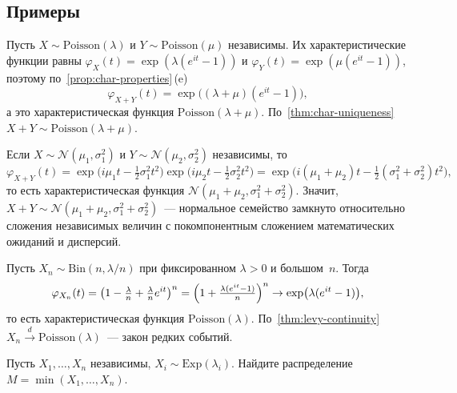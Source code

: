 \subsection*{Примеры}

\begin{example}
\label{ex:poisson-sum}
Пусть $X \sim \mathrm{Poisson}(\lambda)$ и $Y \sim \mathrm{Poisson}(\mu)$ независимы. Их характеристические функции равны $\varphi_X(t) = \exp(\lambda(e^{it} - 1))$ и $\varphi_Y(t) = \exp(\mu(e^{it} - 1))$, поэтому по~\cref{prop:char-properties}\,(e)
\[
  \varphi_{X + Y}(t) = \exp\bigl((\lambda + \mu)(e^{it} - 1)\bigr),
\]
а это характеристическая функция $\mathrm{Poisson}(\lambda + \mu)$. По~\cref{thm:char-uniqueness} $X + Y \sim \mathrm{Poisson}(\lambda + \mu)$.
\end{example}

\begin{example}
\label{ex:normal-sum}
Если $X \sim \mathcal{N}(\mu_1, \sigma_1^2)$ и $Y \sim \mathcal{N}(\mu_2, \sigma_2^2)$ независимы, то
\[
  \varphi_{X + Y}(t) = \exp\bigl(i \mu_1 t - \tfrac{1}{2} \sigma_1^2 t^2\bigr) \exp\bigl(i \mu_2 t - \tfrac{1}{2} \sigma_2^2 t^2\bigr) = \exp\bigl(i(\mu_1 + \mu_2) t - \tfrac{1}{2}(\sigma_1^2 + \sigma_2^2) t^2\bigr),
\]
то есть характеристическая функция $\mathcal{N}(\mu_1 + \mu_2, \sigma_1^2 + \sigma_2^2)$. Значит, $X + Y \sim \mathcal{N}(\mu_1 + \mu_2, \sigma_1^2 + \sigma_2^2)$~--- нормальное семейство замкнуто относительно сложения независимых величин с покомпонентным сложением математических ожиданий и дисперсий.
\end{example}

\begin{example}
\label{ex:poisson-approx-binomial}
Пусть $X_n \sim \mathrm{Bin}(n, \lambda/n)$ при фиксированном $\lambda > 0$ и большом~$n$. Тогда
\[
  \varphi_{X_n}(t) = \bigl(1 - \tfrac{\lambda}{n} + \tfrac{\lambda}{n} e^{it}\bigr)^n = \Bigl(1 + \tfrac{\lambda(e^{it} - 1)}{n}\Bigr)^n \to \exp\bigl(\lambda(e^{it} - 1)\bigr),
\]
то есть характеристическая функция $\mathrm{Poisson}(\lambda)$. По~\cref{thm:levy-continuity} $X_n \xrightarrow{d} \mathrm{Poisson}(\lambda)$~--- закон редких событий.
\end{example}

\begin{problem}
\label{prob:exponential-min}
Пусть $X_1, \dots, X_n$ независимы, $X_i \sim \mathrm{Exp}(\lambda_i)$. Найдите распределение $M = \min(X_1, \dots, X_n)$.
\end{problem}

